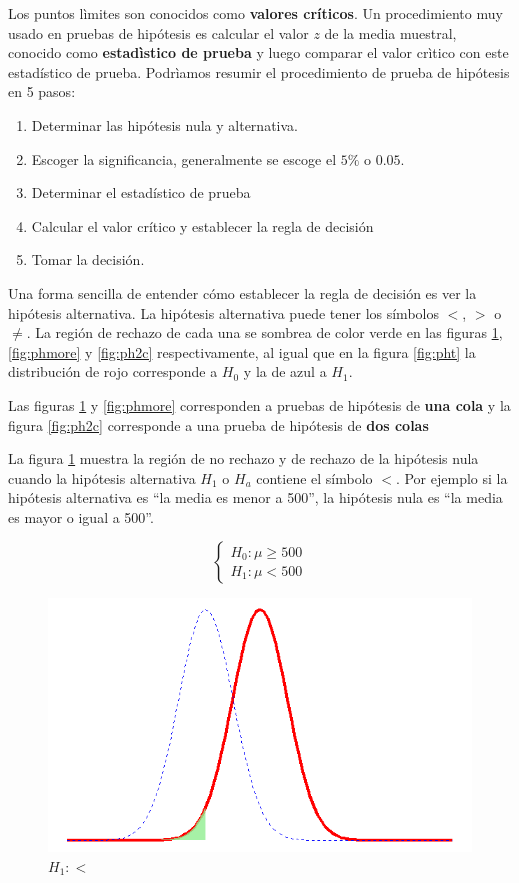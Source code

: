 \documentclass[
]{krantz}
\providecommand{\tightlist}{%
  \setlength{\itemsep}{0pt}\setlength{\parskip}{0pt}}
\begin{document}
Los puntos lìmites son conocidos como \textbf{valores críticos}. Un procedimiento muy usado en pruebas de hipótesis es calcular el valor \(z\) de la media muestral, conocido como \textbf{estadìstico de prueba} y luego comparar el valor crìtico con este estadístico de prueba. Podrìamos resumir el procedimiento de prueba de hipótesis en 5 pasos:

\begin{enumerate}
\def\labelenumi{\arabic{enumi}.}
\tightlist
\item
  Determinar las hipótesis nula y alternativa.
\item
  Escoger la significancia, generalmente se escoge el \(5\%\) o \(0.05\).
\item
  Determinar el estadístico de prueba
\item
  Calcular el valor crítico y establecer la regla de decisión
\item
  Tomar la decisión.
\end{enumerate}

Una forma sencilla de entender cómo establecer la regla de decisión es ver la hipótesis alternativa. La hipótesis alternativa puede tener los símbolos \(<\), \(>\) o \(\neq\). La región de rechazo de cada una se sombrea de color verde en las figuras \ref{fig:phless}, \ref{fig:phmore} y \ref{fig:ph2c} respectivamente, al igual que en la figura \ref{fig:pht} la distribución de rojo corresponde a \(H_0\) y la de azul a \(H_1\).

Las figuras \ref{fig:phless} y \ref{fig:phmore} corresponden a pruebas de hipótesis de \textbf{una cola} y la figura \ref{fig:ph2c} corresponde a una prueba de hipótesis de \textbf{dos colas}

La figura \ref{fig:phless} muestra la región de no rechazo y de rechazo de la hipótesis nula cuando la hipótesis alternativa \(H_1\) o \(H_a\) contiene el símbolo \(<\). Por ejemplo si la hipótesis alternativa es ``la media es menor a 500'', la hipótesis nula es ``la media es mayor o igual a 500''.

\begin{equation} 
\begin{cases} 
H_0: \mu \geq 500 \\ 
H_1: \mu < 500
\end{cases} 
\end{equation}

\begin{figure}[!h]

{\centering \includegraphics[width=0.6\linewidth]{phless} 

}

\caption{$H_1:<$}\label{fig:phless}
\end{figure}
\end{document}
